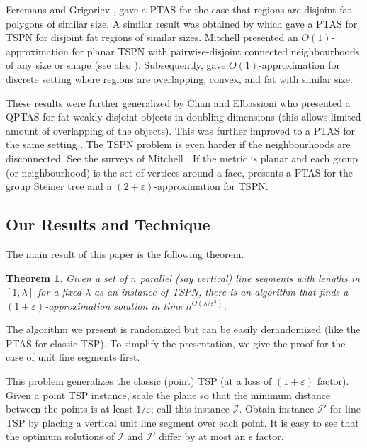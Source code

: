 \documentclass[pdflatex,sn-mathphys-num]{sn-jnl}
\theoremstyle{thmstyleone}
\newtheorem{theorem}{Theorem}
\newcommand{\eps}{\varepsilon}
\newcommand{\calI}{{\mathcal I}}
\begin{document}
Feremans and Grigoriev \cite{FG05}, gave a PTAS for the case that regions are disjoint fat polygons of similar size.
A similar result was obtained by \cite{BodlaenderFGPSW09} which gave a PTAS for TSPN for disjoint fat regions of similar sizes.
Mitchell \cite{Mitchell10} presented an $O(1)$-approximation for planar TSPN with pairwise-disjoint connected neighbourhoods of any size or shape (see also \cite{Berg05}). Subsequently, \cite{EFMS05} gave $O(1)$-approximation
for discrete setting where regions are overlapping, convex, and fat with similar size.

These results were further generalized by Chan and Elbassioni \cite{ChanE11} who presented a QPTAS for fat weakly disjoint objects in doubling dimensions (this allows limited amount of overlapping of the objects). This was further improved to a PTAS for the same setting \cite{ChanHJ16}. 
The TSPN problem is even harder if the neighbourhoods are disconnected. See the surveys of Mitchell \cite{Mitchell00,Mitchell04}. 
If the metric is planar and each group (or neighbourhood) is the set of vertices around a face, \cite{Bateni16} presents a PTAS for the group Steiner tree and a $(2+\eps)$-approximation for TSPN.


\subsection{Our Results and Technique}
The main result of this paper is the following theorem.
\begin{theorem}\label{thm:main}
    Given a set of $n$ parallel (say vertical)
    line segments with lengths in $[1,\lambda]$ for a fixed $\lambda$
    as an instance of TSPN, there is an algorithm that finds a $(1+\eps)$-approximation solution in time $n^{O(\lambda/\eps^3)}$.
\end{theorem}


The algorithm we present is randomized but can be easily derandomized (like the PTAS for classic TSP).
To simplify the presentation, we give the proof for the case of unit line segments first.


This problem generalizes the classic (point) TSP (at a loss of $(1+\eps)$ factor). Given a point TSP instance, scale the plane so that 
the minimum distance between the points is at least $1/\eps$; call this instance $\calI$. Obtain instance $\calI'$ for line TSP by placing a vertical unit line segment over each point. It is easy to see that the optimum solutions of $\calI$ and $\calI'$ differ by at most an $\epsilon$ factor.
\end{document}
